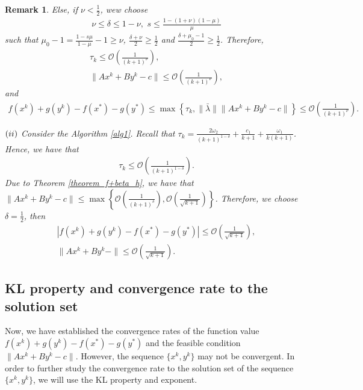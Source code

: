 \documentclass{article}
\numberwithin{equation}{section}
\newtheorem{remark}{Remark}[theorem]
\begin{document}
\begin{remark}
Else, if $\nu<\frac{1}{2}$, wew choose 
\begin{align}
    \nu \leq \delta \leq 1-\nu, \hspace{4pt} s\leq\frac{1-(1+\nu)(1-\mu)}{\mu} \nonumber 
\end{align}
such that $\mu_0-1=\frac{1-s\mu}{1-\mu}-1 \geq \nu$, $\frac{\delta+\nu}{2}\geq \frac{1}{2}$ and $
\frac{\delta+\mu_0-1}{2} \geq \frac{1}{2}$. Therefore,
\begin{equation}
    \begin{array}{c}
        \tau_k \leq  \mathcal{O}\left( \frac{1}{(k+1)^{\nu}} \right), \nonumber \\
        \|Ax^k+ By^k -c\rVert \leq \mathcal{O} \left( \frac{1}{(k+1)^{\nu}} \right), \nonumber
    \end{array}
\end{equation}
and 
\begin{align}
    f(x^k)+g(y^k) -f(x^*) -g(y^*) \leq \max\left\{ \tau_k, \|\bar{\lambda}\rVert\|Ax^k+By^k-c\rVert \right\} 
    \leq \mathcal{O} \left( \frac{1}{(k+1)^{\nu}} \right). \nonumber 
\end{align} 

$(\romannumeral2)$ Consider the Algorithm \ref{alg1}. 
Recall that $\tau_k= \frac{2\omega_2}{(k+1)^{1-\delta}}+ \frac{c_1}{k+1}+ \frac{\omega_1}{k(k+1)}$. 
Hence, we have that
\begin{align}
    \tau_k\leq \mathcal{O}\left( \frac{1}{(k+1)^{1-\delta}} \right). \nonumber
\end{align} 
Due to Theorem \ref{theorem_f+beta_h}, we have that 
$\|Ax^k+ By^k- c\rVert \leq \max\left\{ \mathcal{O} \left( \frac{1}{(k+1)^{\delta}} \right), 
\mathcal{O} \left( \frac{1}{\sqrt{k+1}} \right)\right\}$. 
Therefore, we choose $\delta = \frac{1}{2}$, then 
\begin{equation}
    \begin{array}{c}
        \left| f(x^k)+ g(y^k)- f(x^*)- g(y^*) \right| \leq \mathcal{O}\left( \frac{1}{\sqrt{k+1}} \right), \nonumber \\
        \|Ax^k+ By^k- \rVert \leq \mathcal{O}\left( \frac{1}{\sqrt{k+1}} \right).   \nonumber
    \end{array}
\end{equation}

\end{remark}



\subsection{KL property and convergence rate to the solution set}
Now, we have established the convergence rates of the function value $f(x^k)+ g(y^k) -f(x^*)- g(y^*)$ and the 
feasible condition $\|Ax^k + By^k - c\rVert$. However, the sequence $\{x^k,y^k\}$ may not be 
convergent. In order to further study the convergence rate to the solution set of the sequence $\{x^k,y^k\}$, we will use the KL property and
exponent. 
\end{document}
